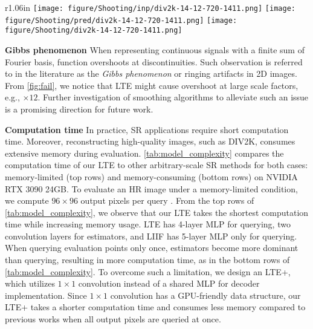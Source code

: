\documentclass[10pt,twocolumn,letterpaper]{article}
\begin{document}
\endgroup

\begingroup
\setlength{\columnsep}{10pt}
\setlength\intextsep{0pt}
\begin{wrapfigure}{r}{1.06in}
\centering
\texttt{[image: figure/Shooting/inp/div2k-14-12-720-1411.png]}
\texttt{[image: figure/Shooting/pred/div2k-14-12-720-1411.png]}
\texttt{[image: figure/Shooting/div2k-14-12-720-1411.png]}

\vspace{-6pt}
\caption{Gibbs phenomenon ($\times12$).}
\label{fig:fail}
\end{wrapfigure}
\textbf{Gibbs phenomenon} When representing continuous signals with a finite sum of Fourier basis, function overshoots at discontinuities. Such observation is referred to in the literature as the \textit{Gibbs phenomenon} or ringing artifacts in 2D images. From \cref{fig:fail}, we notice that LTE might cause overshoot at large scale factors, e.g., $\times12$. Further investigation of smoothing algorithms to alleviate such an issue is a promising direction for future work.

\endgroup

\textbf{Computation time} In practice, SR applications require short computation time. Moreover, reconstructing high-quality images, such as DIV2K, consumes extensive memory during evaluation. \cref{tab:model_complexity} compares the computation time of our LTE to other arbitrary-scale SR methods for both cases: memory-limited (top rows) and memory-consuming (bottom rows) on NVIDIA RTX 3090 24GB. To evaluate an HR image under a memory-limited condition, we compute $96\times96$ output pixels per query \cite{chen2021learning}. From the top rows of \cref{tab:model_complexity}, we observe that our LTE takes the shortest computation time while increasing memory usage. LTE has 4-layer MLP for querying, two convolution layers for estimators, and LIIF has 5-layer MLP only for querying. When querying evaluation points only once, estimators become more dominant than querying, resulting in more computation time, as in the bottom rows of \cref{tab:model_complexity}. To overcome such a limitation, we design an LTE+, which utilizes $1\times1$ convolution instead of a shared MLP for decoder implementation. Since $1\times1$ convolution has a GPU-friendly data structure, our LTE+ takes a shorter computation time and consumes less memory compared to previous works when all output pixels are queried at once.
\end{document}
